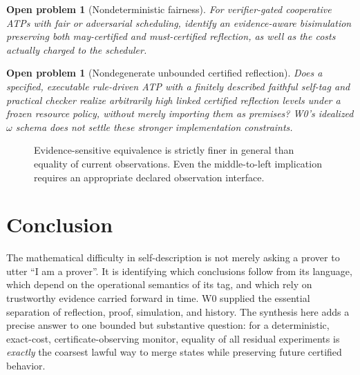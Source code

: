 \documentclass[11pt,letterpaper]{article}
\newtheorem{problem}[theorem]{Open problem}
\begin{document}
\begin{problem}[Nondeterministic fairness]
For verifier-gated cooperative ATPs with fair or adversarial scheduling, identify an evidence-aware bisimulation preserving both may-certified and must-certified reflection, as well as the costs actually charged to the scheduler.
\end{problem}
\begin{problem}[Nondegenerate unbounded certified reflection]
Does a specified, executable rule-driven ATP with a finitely described faithful self-tag and practical checker realize arbitrarily high \emph{linked certified} reflection levels under a frozen resource policy, without merely importing them as premises? W0's idealized $\omega$ schema does not settle these stronger implementation constraints.
\end{problem}

\begin{figure}[htbp]\centering
{}
\caption{Evidence-sensitive equivalence is strictly finer in general than equality of current observations. Even the middle-to-left implication requires an appropriate declared observation interface.}
\end{figure}

\section{Conclusion}
The mathematical difficulty in self-description is not merely asking a prover to utter ``I am a prover''. It is identifying which conclusions follow from its language, which depend on the operational semantics of its tag, and which rely on trustworthy evidence carried forward in time. W0 supplied the essential separation of reflection, proof, simulation, and history. The synthesis here adds a precise answer to one bounded but substantive question: for a deterministic, exact-cost, certificate-observing monitor, equality of all residual experiments is \emph{exactly} the coarsest lawful way to merge states while preserving future certified behavior.
\end{document}
